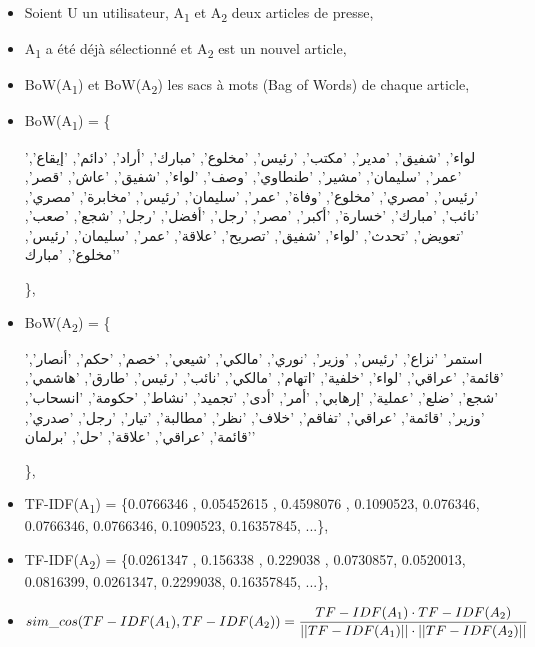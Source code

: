     \begin{itemize}[label={}, leftmargin=0cm]
        \item Soient U un utilisateur, A\textsubscript{1} et A\textsubscript{2} deux articles de presse,
        \item A\textsubscript{1} a été déjà sélectionné et A\textsubscript{2} est un nouvel article,
        \item BoW(A\textsubscript{1}) et BoW(A\textsubscript{2}) les sacs à mots (Bag of Words) de chaque article,\\

        \item BoW(A\textsubscript{1}) = \{\begin{arab}'لواء', 'شفيق', 'مدير', 'مكتب', 'رئيس', 'مخلوع', 'مبارك', 'أراد', 'دائم', 'إيقاع', 'عمر', 'سليمان', 'مشير', 'طنطاوي', 'وصف', 'لواء', 'شفيق', 'عاش', 'قصر', 'رئيس', 'مصري', 'مخلوع', 'وفاة', 'عمر', 'سليمان', 'رئيس', 'مخابرة', 'مصري', 'نائب', 'مبارك', 'خسارة', 'أكبر', 'مصر', 'رجل', 'أفضل', 'رجل', 'شجع', 'صعب', 'تعويض', 'تحدث', 'لواء', 'شفيق', 'تصريح', 'علاقة', 'عمر', 'سليمان', 'رئيس', 'مخلوع', 'مبارك'\end{arab}\},

        \item BoW(A\textsubscript{2}) = \{\begin{arab}'استمر' 'نزاع', 'رئيس', 'وزير', 'نوري', 'مالكي', 'شيعي', 'خصم', 'حكم', 'أنصار', 'قائمة', 'عراقي', 'لواء', 'خلفية', 'اتهام', 'مالكي', 'نائب', 'رئيس', 'طارق', 'هاشمي', 'شجع', 'ضلع', 'عملية', 'إرهابي', 'أمر', 'أدى', 'تجميد', 'نشاط', 'حكومة', 'انسحاب', 'وزير', 'قائمة', 'عراقي', 'تفاقم', 'خلاف', 'نظر', 'مطالبة', 'تيار', 'رجل', 'صدري', 'قائمة', 'عراقي', 'علاقة', 'حل', 'برلمان'\end{arab}\},


        \item TF-IDF(A\textsubscript{1}) = \{0.0766346 , 0.05452615 , 0.4598076 , 0.1090523,  0.076346, 0.0766346, 0.0766346, 0.1090523, 0.16357845, ...\},

        \item TF-IDF(A\textsubscript{2}) = \{0.0261347 , 0.156338 , 0.229038 , 0.0730857,  0.0520013, 0.0816399, 0.0261347, 0.2299038, 0.16357845, ...\},

        \item \[sim\_cos(TF-IDF(A\textsubscript{1}), TF-IDF(A\textsubscript{2})) = \frac {TF-IDF(A\textsubscript{1}) \cdot TF-IDF(A\textsubscript{2})}{||TF-IDF(A\textsubscript{1})|| \cdot ||TF-IDF(A\textsubscript{2})||}\]
    \end{itemize}
